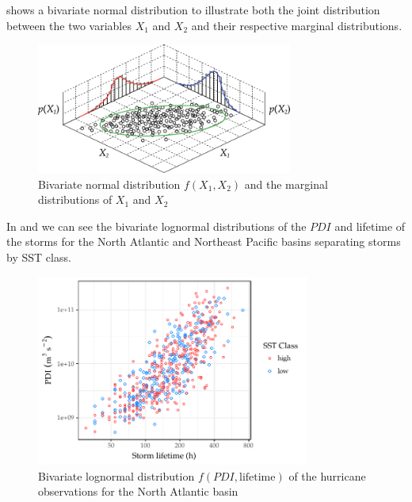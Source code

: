  shows a bivariate normal distribution to illustrate both the joint distribution between the two variables $X_{1}$ and $X_{2}$ and their respective marginal distributions.
\begin{figure}[H]
	\centering
	\includegraphics[width=0.75\textwidth]{images/bvn-example}
	\caption{Bivariate normal distribution $f(X_{1}, X_{2})$ and the marginal distributions of $X_{1}$ and $X_{2}$}
	\label{fig:bvn-example}
\end{figure}

In  and  we can see the bivariate lognormal distributions of the $PDI$ and lifetime of the storms for the North Atlantic and Northeast Pacific basins separating storms by SST class.

\begin{figure}[H]
	\centering
	\includegraphics[width=0.8\textwidth]{images/natl-bvln}
	\caption{Bivariate lognormal distribution $f(PDI, \text{lifetime})$ of the hurricane observations for the North Atlantic basin}
	\label{fig:natl-bvln}
\end{figure}

